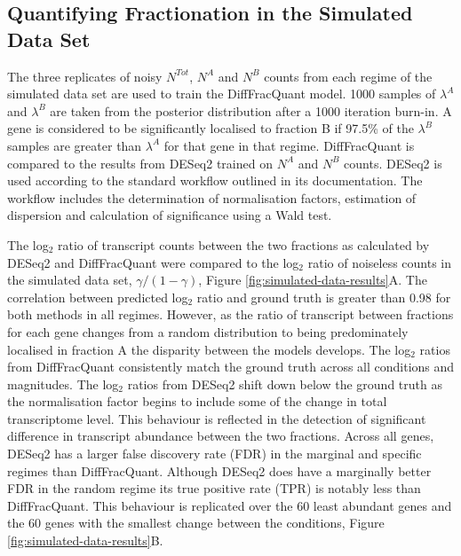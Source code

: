 \documentclass[../main.tex]{subfiles}
\begin{document}
\subsection{Quantifying Fractionation in the Simulated Data Set}

The three replicates of noisy $N^{Tot}$, $N^{A}$ and $N^{B}$ counts from each regime of the simulated data set are used to train the DiffFracQuant model.
1000 samples of $\lambda^{A}$ and $\lambda^{B}$ are taken from the posterior distribution after a 1000 iteration burn-in.
A gene is considered to be significantly localised to fraction B if 97.5\% of the $\lambda^{B}$ samples are greater than $\lambda^{A}$ for that gene in that regime.
DiffFracQuant is compared to the results from DESeq2 trained on $N^{A}$ and $N^{B}$ counts.
DESeq2 is used according to the standard workflow outlined in its documentation.
The workflow includes the determination of normalisation factors, estimation of dispersion and calculation of significance using a Wald test. 

The log$_2$ ratio of transcript counts between the two fractions as calculated by DESeq2 and DiffFracQuant were compared to the log$_2$ ratio of noiseless counts in the simulated data set, $\gamma/(1-\gamma)$, Figure \ref{fig:simulated-data-results}A.
The correlation between predicted log$_2$ ratio and ground truth is greater than 0.98 for both methods in all regimes. 
However, as the ratio of transcript between fractions for each gene changes from a random distribution to being predominately localised in fraction A the disparity between the models develops. 
The log$_2$ ratios from DiffFracQuant consistently match the ground truth across all conditions and magnitudes.
The log$_2$ ratios from DESeq2 shift down below the ground truth as the normalisation factor begins to include some of the change in total transcriptome level.
This behaviour is reflected in the detection of significant difference in transcript abundance between the two fractions.
Across all genes, DESeq2 has a larger false discovery rate (FDR) in the marginal and specific regimes than DiffFracQuant.
Although DESeq2 does have a marginally better FDR in the random regime its true positive rate (TPR) is notably less than DiffFracQuant.
This behaviour is replicated over the 60 least abundant genes and the 60 genes with the smallest change between the conditions, Figure \ref{fig:simulated-data-results}B.
\end{document}
